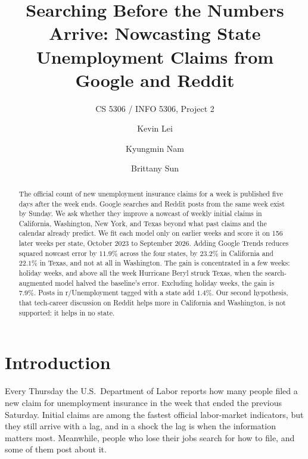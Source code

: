 \documentclass[sigconf,nonacm]{acmart}
\begin{document}
\title{Searching Before the Numbers Arrive: Nowcasting State Unemployment Claims from
Google and Reddit}
\subtitle{CS 5306 / INFO 5306, Project 2}

\author{Kevin Lei}

\author{Kyungmin Nam}

\author{Brittany Sun}

\begin{abstract}
The official count of new unemployment insurance claims for a week is published five days
after the week ends. Google searches and Reddit posts from the same week exist by Sunday. We
ask whether they improve a nowcast of weekly initial claims in California, Washington, New
York, and Texas beyond what past claims and the calendar already predict. We fit each model
only on earlier weeks and score it on 156 later weeks per state, October 2023 to September
2026. Adding Google Trends reduces squared nowcast error by $11.9\%$ across the four states,
by $23.2\%$ in California and $22.1\%$ in Texas, and not at all in Washington. The gain is
concentrated in a few weeks: holiday weeks, and above all the week Hurricane Beryl struck
Texas, when the search-augmented model halved the baseline's error. Excluding holiday weeks,
the gain is $7.9\%$. Posts in r/Unemployment tagged with a state add $1.4\%$. Our second
hypothesis, that tech-career discussion on Reddit helps more in California and Washington,
is not supported: it helps in no state.
\end{abstract}

\maketitle

\section{Introduction}

Every Thursday the U.S.\ Department of Labor reports how many people filed a new claim for
unemployment insurance in the week that ended the previous Saturday. Initial claims are
among the fastest official labor-market indicators, but they still arrive with a lag, and
in a shock the lag is when the information matters most. Meanwhile, people who lose their
jobs search for how to file, and some of them post about it.
\end{document}
